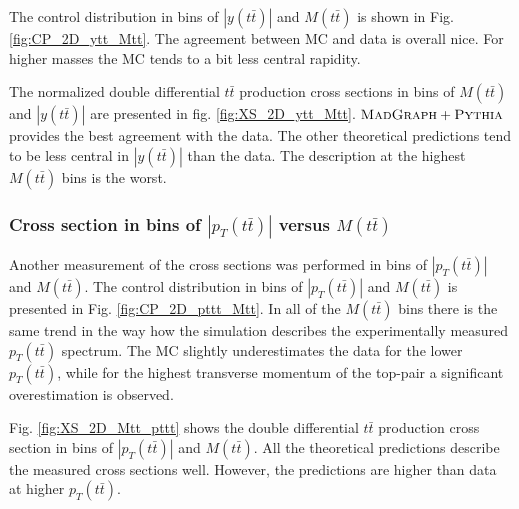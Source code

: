 The control distribution in bins of $|y(t\bar{t})|$ and $M(t\bar{t})$ is shown in Fig. \ref{fig:CP_2D_ytt_Mtt}. The agreement between MC and data is overall nice.
For higher masses the MC tends to a bit less central rapidity.

The normalized double differential $t\bar{t}$ production cross sections in bins of $M(t\bar{t})$ and $|y(t\bar{t})|$ are presented in fig. \ref{fig:XS_2D_ytt_Mtt}.
$\textsc{MadGraph}+\textsc{Pythia}$ provides the best agreement with the data. 
The other theoretical predictions tend to be less central in $|y(t\bar{t})|$ than the data. 
The description at the highest $M(t\bar{t})$ bins is the worst.

\subsubsection{Cross section in bins of $|p_{T}(t\bar{t})|$ versus $M(t\bar{t})$}

Another measurement of the cross sections was performed in bins of $|p_{T}(t\bar{t})|$ and $M(t\bar{t})$.
The control distribution in bins of $|p_{T}(t\bar{t})|$ and $M(t\bar{t})$ is presented in Fig. \ref{fig:CP_2D_pttt_Mtt}. In all of the $M(t\bar{t})$
bins there is the same trend in the way how the simulation describes the experimentally measured $p_{T}(t\bar{t})$ spectrum. The MC slightly underestimates
the data for the lower $p_{T}(t\bar{t})$, while for the highest transverse momentum of the top-pair a significant overestimation is observed.

Fig. \ref{fig:XS_2D_Mtt_pttt} shows the double differential $t\bar{t}$ production cross section in bins of $|p_{T}(t\bar{t})|$ and $M(t\bar{t})$.
All the theoretical predictions describe the measured cross sections well. However, the predictions are higher than data at higher $p_{T}(t\bar{t})$.

% 
% 


